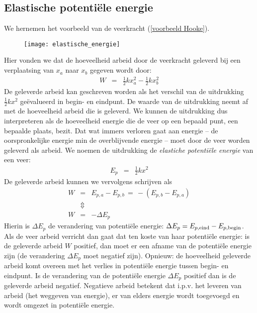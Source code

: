 
\subsection{Elastische potenti\"ele energie}\label{elastische
potentiele energie}

We hernemen het voorbeeld van de veerkracht (\ref{voorbeeld Hooke}).
\begin{figure}[h]
\begin{center}
\texttt{[image: elastische\_energie]}
\end{center}
\end{figure}
\newline
Hier vonden we dat de hoeveelheid arbeid door de veerkracht geleverd
bij een verplaatsing van $x_a$ naar $x_b$ gegeven wordt door:
\begin{eqnarray*}
W&=&\frac{1}{2}kx_ a^2-\frac{1}{2}kx_ b^2
\end{eqnarray*}
De geleverde arbeid kan geschreven worden als het verschil van de uitdrukking $\frac{1}{2}kx^2$ ge\"evalueerd in begin- en eindpunt. De waarde van de uitdrukking neemt af met de hoeveelheid arbeid die is geleverd. We kunnen de uitdrukking dus interpreteren als de hoeveelheid energie die de veer op een bepaald punt, een bepaalde plaats, bezit. Dat wat immers verloren gaat aan energie -- de oorspronkelijke energie min de overblijvende energie -- moet door de veer worden geleverd als arbeid. We noemen de uitdrukking de \textit{elastiche potenti\"ele energie} van een veer:
\begin{eqnarray}
E_p&=&\frac{1}{2}kx^2\label{Ep=1/2kx^2}
\end{eqnarray}
De geleverde arbeid kunnen we vervolgens schrijven als
\begin{eqnarray*}
W&=&E_{p,a}-E_{p,b}\,=\,-(E_{p,b}-E_{p,a})\\
&\Updownarrow&\\
W&=&-\Delta E_p
\end{eqnarray*}
Hierin is $\Delta E_p$ de verandering van potenti\"ele energie: $\Delta E_p=E_{p,\rm eind}-E_{p,\rm begin}$. Als de veer arbeid verricht dan gaat dat ten koste van haar potenti\"ele energie: is de geleverde arbeid $W$ positief, dan moet er een afname van de potenti\"ele energie zijn (de verandering $\Delta E_p$ moet negatief zijn). Opnieuw: de hoe\-veel\-heid geleverde arbeid komt overeen met het verlies in potenti\"ele energie tussen begin- en eindpunt. Is de verandering van de potenti\"ele energie $\Delta E_p$ positief dan is de geleverde arbeid negatief. Negatieve arbeid betekent dat i.p.v. het leveren van arbeid (het weggeven van energie), er van elders energie wordt toegevoegd en wordt omgezet in potenti\"ele energie.

